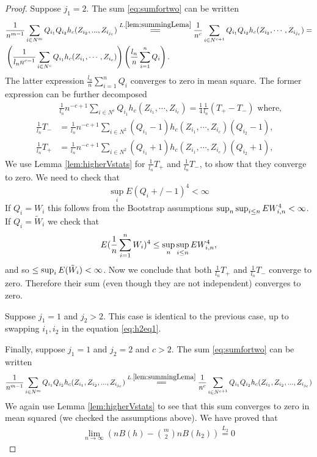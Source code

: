 \begin{proof}
Suppose  $j_1 = 2$. The sum  \ref{eq:sumfortwo} can be written
\begin{align}
 \label{eq:h2eq1}
 \begin{split}
&\frac{1} {n^{m-1}}  \sum_{i \in N^m}  Q_{i_1} Q_{i_2} h_c(Z_{i_2},...,Z_{i_{j_c}})  
\overset{L.\ref{lem:summingLema}}{=\joinrel=} \frac{1} {n^c}  \sum_{i \in N^{c+1}}   Q_{i_1} Q_{i_2} h_c(Z_{i_2},\cdots,Z_{i_{j_c}}) = \\
& \left( \frac{1}{l_n n^{c-1} } \sum_{i \in N^c} Q_{i_1}  h_c(Z_{i_1}, \cdots ,Z_{i_c}) \right) \left( \frac {l_n}{n} \sum_{i=1}^{n}Q_i \right).
\end{split}
\end{align}
The latter expression $\frac {l_n}{n} \sum_{i=1}^{n}Q_i$ converges to zero in mean square. The former expression can be further decomposed
\begin{align*}
& \frac{1}{ l_n} n^{-c+1} \sum_{i \in N^c} Q_{i_1}  h_c(Z_{i_1}, \cdots ,Z_{i_c}) = \frac 1 4 \frac{1}{l_n} (T_{+}-T_{-}) \text{ where,} \\   
\frac{1}{l_n} T_{-} &=   \frac{1}{l_n} n^{-c+1} \sum_{i \in N^2} (Q_{i_1}-1)h_c(Z_{i_1}, \cdots ,Z_{i_c})(Q_{i_2}-1), \\
\frac{1}{l_n} T_{+} &= \frac{1}{l_n} n^{-c+1} \sum_{i \in N^2}  (Q_{i_1}+1)h_c(Z_{i_1}, \cdots ,Z_{i_c})(Q_{i_2}+1),
\end{align*}
We  use Lemma \ref{lem:higherVstats} for $\frac{1}{l_n} T_{+}$ and $\frac{1}{l_n} T_{-}$, to show that they converge to zero. We  need to check that 
\[
 \sup_{i } E ( Q_{i}+/-1)^4   <\infty
\]
If $Q_i = W_i$ this follows from the Bootstrap assumptions $\sup_{n} \sup_{i \leq n} E W_{i,n}^{4} < \infty$. If $Q_i = \tilde W_i$ we check that  
\[
 E (\frac 1 n \sum_{i=1}^n W_i)^4  \leq \sup_{n} \sup_{i \leq n} E W_{i,n}^{4},
\]
and so $\leq  \sup_{i} E (\tilde W_i)  < \infty$. Now we conclude that both $\frac{1}{l_n} T_{+}$ and $\frac{1}{l_n} T_{-}$ converge to zero. Therefore their sum (even though they are not independent) converges to zero. 

Suppose $j_1=1$ and $j_2>2$. This case is identical to the previous case, up to swapping $i_1,i_2$ in the equation \ref{eq:h2eq1}.  

Finally, suppose $j_1=1$ and $j_2=2$ and $c>2$. The sum  \ref{eq:sumfortwo} can be written
\begin{align*}
\frac{1} {n^{m-1}}  \sum_{i \in N^m}  Q_{i_1} Q_{i_2} h_c(Z_{i_1},Z_{i_2},...,Z_{i_{j_c}})  \overset{L.\ref{lem:summingLema}}{=\joinrel=} \frac{1} {n^c}  \sum_{i \in N^{c+1}}   Q_{i_1} Q_{i_2}  h_c(Z_{i_1},Z_{i_2},...,Z_{i_{j_c}})
\end{align*}
We  again use Lemma \ref{lem:higherVstats} to see that this sum converges to zero in mean squared (we checked the assumptions above). We have proved that 
\begin{align*}
  \lim_{n \to \infty} \left( n B(h) -  \binom m 2  n B(h_2)  \right) \overset{L_2}{=} 0
\end{align*}
\end{proof}
